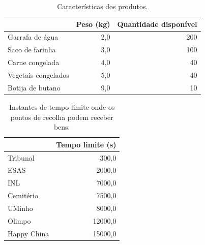 \documentclass[12pt, a4paper]{article}
\begin{document}
\begin{table}[H]
    \small

    \begin{adjustwidth}{-1.5cm}{-1.5cm}
        \begin{center}
            \begin{tabular}{|l|r|r|}
                \hline
                & Peso (kg)
                & Quantidade disponível \\

                \hline
                Garrafa de água & 2,0 & 200 \\
                \hline
                Saco de farinha & 3,0 & 100 \\
                \hline
                Carne congelada & 4,0 & 40 \\
                \hline
                Vegetais congelados & 5,0 & 40 \\
                \hline
                Botija de butano & 9,0 & 10 \\
                \hline
            \end{tabular}
        \end{center}
    \end{adjustwidth}

    \caption{Características dos produtos.}
\end{table}

\begin{table}[H]
    \small

    \begin{adjustwidth}{-1.5cm}{-1.5cm}
        \begin{center}
            \begin{tabular}{|l|r|}
                \hline
                & Tempo limite (s) \\

                \hline
                Tribunal & 300,0 \\
                \hline
                ESAS & 2000,0 \\
                \hline
                INL & 7000,0 \\
                \hline
                Cemitério & 7500,0 \\
                \hline
                UMinho & 8000,0 \\
                \hline
                Olimpo & 12000,0 \\
                \hline
                Happy China & 15000,0 \\
                \hline

            \end{tabular}
        \end{center}
    \end{adjustwidth}

    \caption{Instantes de tempo limite onde os pontos de recolha podem receber bens.}
\end{table}
\end{document}
